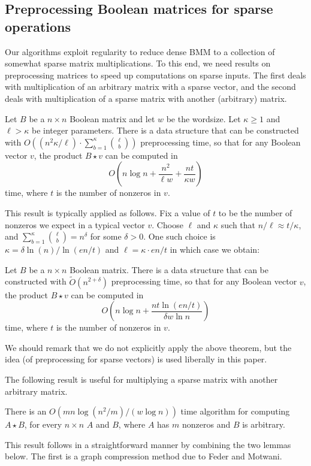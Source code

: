 \subsection{Preprocessing Boolean matrices for sparse operations}

Our algorithms exploit regularity to reduce dense BMM to a collection of somewhat sparse matrix multiplications. To this end, we need results on preprocessing matrices to speed up computations on sparse inputs. The first deals with multiplication of an arbitrary matrix with a sparse vector, and the second deals with multiplication of a sparse matrix with another (arbitrary) matrix.

\begin{theorem} \label{processforsparse}
Let $B$ be a $n \times n$ Boolean matrix and let $w$ be the wordsize. Let $\kappa \geq 1$ and $\ell > \kappa$ be integer parameters. There is a data structure that can be constructed with $O((n^2 \kappa / \ell) \cdot \sum_{b=1}^{\kappa} \binom{\ell}{b})$ preprocessing time, so that for any Boolean vector $v$, the product $B \star v$ can be computed  in 
\[
O\left(n \log n + \frac{n^2}{\ell w} + \frac{n t}{\kappa w}\right)
\]
time, where $t$ is the number of nonzeros in $v$.
\end{theorem}

This result is typically applied as follows. Fix a value of $t$ to be the number of nonzeros we expect in a typical vector $v$. Choose $\ell$ and $\kappa$ such that $n/\ell \approx t/\kappa$, and $\sum_{b=1}^{\kappa} \binom{\ell}{b} = n^\delta$ for some $\delta > 0$. One such choice is $\kappa = \delta \ln(n)/\ln(en/t)$ and $\ell = \kappa \cdot en/t$ in which case we obtain:

\begin{theorem}
Let $B$ be a $n \times n$ Boolean matrix.  There is a data structure that can be constructed with $\tilde{O}(n^{2+\delta})$ preprocessing time, so that for any Boolean vector $v$, the product $B \star v$ can be computed in 
$$
O\left(n \log n + \frac{n t \ln(en/t)}{\delta w \ln n }\right)
$$
time, where $t$ is the number of nonzeros in $v$.
\end{theorem}

We should remark that we do not explicitly apply the above theorem, but the idea (of preprocessing for sparse vectors) is used liberally in this paper.

The following result is useful for multiplying a sparse matrix with another arbitrary matrix.
\begin{theorem}\label{sparsemm} There is an $O(m n \log(n^2/m)/(w\log n))$ time algorithm for computing $A \star B$, for every $n\times n$ $A$ and $B$, where $A$ has $m$ nonzeros and $B$ is arbitrary.
\end{theorem}
This result follows in a straightforward manner by combining the two lemmas below.
The first is a graph compression method due to Feder and Motwani.

